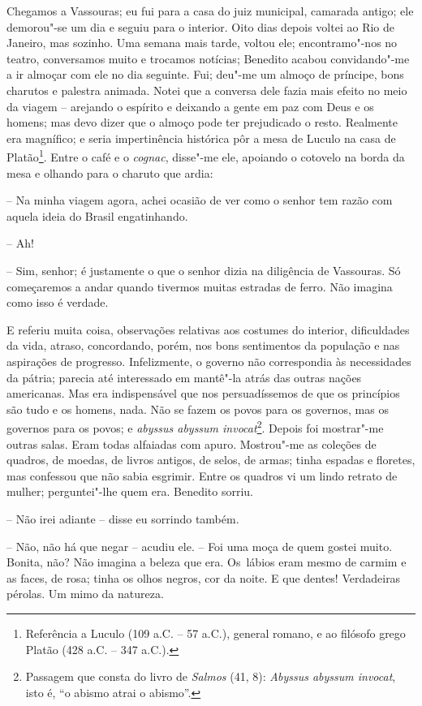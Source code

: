Chegamos a Vassouras; eu fui para a casa do juiz municipal, camarada
antigo; ele demorou"-se um dia e seguiu para o interior. Oito dias depois
voltei ao Rio de Janeiro, mas sozinho. Uma semana mais tarde, voltou
ele; encontramo"-nos no teatro, conversamos muito e trocamos notícias;
Benedito acabou convidando"-me a ir almoçar com ele no dia seguinte. Fui;
deu"-me um almoço de príncipe, bons charutos e palestra animada. Notei
que a conversa dele fazia mais efeito no meio da viagem -- arejando o
espírito e deixando a gente em paz com Deus e os homens; mas devo dizer
que o almoço pode ter prejudicado o resto. Realmente era magnífico; e
seria impertinência histórica pôr a mesa de Luculo na casa de
Platão\footnote{Referência a Luculo (109 a.C. -- 57 a.C.), general
  romano, e ao filósofo grego Platão (428 a.C. -- 347 a.C.).}. Entre o
café e o \emph{cognac}, disse"-me ele, apoiando o cotovelo na borda da
mesa e olhando para o charuto que ardia:

-- Na minha viagem agora, achei ocasião de ver como o senhor tem razão
com aquela ideia do Brasil engatinhando.

-- Ah!

-- Sim, senhor; é justamente o que o senhor dizia na diligência de
Vassouras. Só começaremos a andar quando tivermos muitas estradas de
ferro. Não imagina como isso é verdade.

E referiu muita coisa, observações relativas aos costumes do interior,
dificuldades da vida, atraso, concordando, porém, nos bons sentimentos
da população e nas aspirações de progresso. Infelizmente, o governo não
correspondia às necessidades da pátria; parecia até interessado em
mantê"-la atrás das outras nações americanas. Mas era indispensável que
nos persuadíssemos de que os princípios são tudo e os homens, nada. Não
se fazem os povos para os governos, mas os governos para os povos; e
\emph{abyssus abyssum invocat}\footnote{Passagem que consta do livro de
  \emph{Salmos} (41, 8): \emph{Abyssus abyssum invocat}, isto é, ``o
  abismo atrai o abismo''.}. Depois foi mostrar"-me outras salas. Eram
todas alfaiadas com apuro. Mostrou"-me as coleções de quadros, de moedas,
de livros antigos, de selos, de armas; tinha espadas e floretes, mas
confessou que não sabia esgrimir. Entre os quadros vi um lindo retrato
de mulher; perguntei"-lhe quem era. Benedito sorriu.

-- Não irei adiante -- disse eu sorrindo também.

-- Não, não há que negar -- acudiu ele. -- Foi uma moça de quem gostei
muito. Bonita, não? Não imagina a beleza que era. Os~lábios eram mesmo
de carmim e as faces, de rosa; tinha os olhos negros, cor da noite. E
que dentes! Verdadeiras pérolas. Um mimo da natureza.


